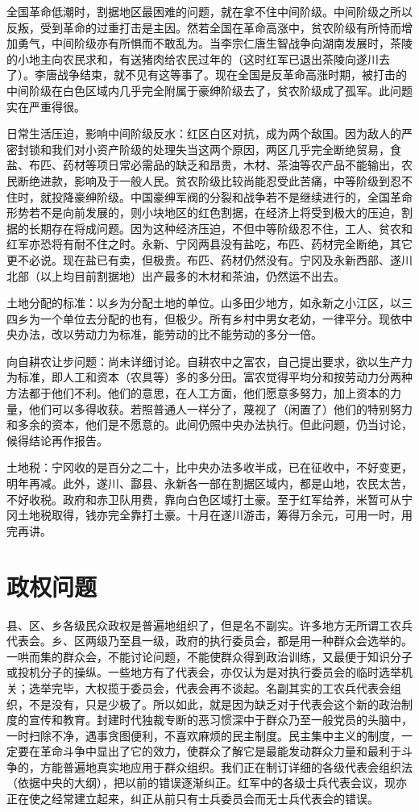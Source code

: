 全国革命低潮时，割据地区最困难的问题，就在拿不住中间阶级。中间阶级之所以反叛，受到革命的过重打击是主因。然若全国在革命高涨中，贫农阶级有所恃而增加勇气，中间阶级亦有所惧而不敢乱为。当李宗仁唐生智战争向湖南发展时，茶陵的小地主向农民求和，有送猪肉给农民过年的（这时红军已退出茶陵向遂川去了）。李唐战争结束，就不见有这等事了。现在全国是反革命高涨时期，被打击的中间阶级在白色区域内几乎完全附属于豪绅阶级去了，贫农阶级成了孤军。此问题实在严重得很。

日常生活压迫，影响中间阶级反水：红区白区对抗，成为两个敌国。因为敌人的严密封锁和我们对小资产阶级的处理失当这两个原因，两区几乎完全断绝贸易，食盐、布匹、药材等项日常必需品的缺乏和昂贵，木材、茶油等农产品不能输出，农民断绝进款，影响及于一般人民。贫农阶级比较尚能忍受此苦痛，中等阶级到忍不住时，就投降豪绅阶级。中国豪绅军阀的分裂和战争若不是继续进行的，全国革命形势若不是向前发展的，则小块地区的红色割据，在经济上将受到极大的压迫，割据的长期存在将成问题。因为这种经济压迫，不但中等阶级忍不住，工人、贫农和红军亦恐将有耐不住之时。永新、宁冈两县没有盐吃，布匹、药材完全断绝，其它更不必说。现在盐已有卖，但极贵。布匹、药材仍然没有。宁冈及永新西部、遂川北部（以上均目前割据地）出产最多的木材和茶油，仍然运不出去。

土地分配的标准：以乡为分配土地的单位。山多田少地方，如永新之小江区，以三四乡为一个单位去分配的也有，但极少。所有乡村中男女老幼，一律平分。现依中央办法，改以劳动力为标准，能劳动的比不能劳动的多分一倍。

向自耕农让步问题：尚未详细讨论。自耕农中之富农，自己提出要求，欲以生产力为标准，即人工和资本（农具等）多的多分田。富农觉得平均分和按劳动力分两种方法都于他们不利。他们的意思，在人工方面，他们愿意多努力，加上资本的力量，他们可以多得收获。若照普通人一样分了，蔑视了（闲置了）他们的特别努力和多余的资本，他们是不愿意的。此间仍照中央办法执行。但此问题，仍当讨论，候得结论再作报告。

土地税：宁冈收的是百分之二十，比中央办法多收半成，已在征收中，不好变更，明年再减。此外，遂川、酃县、永新各一部在割据区域内，都是山地，农民太苦，不好收税。政府和赤卫队用费，靠向白色区域打土豪。至于红军给养，米暂可从宁冈土地税取得，钱亦完全靠打土豪。十月在遂川游击，筹得万余元，可用一时，用完再讲。

\section{政权问题}

县、区、乡各级民众政权是普遍地组织了，但是名不副实。许多地方无所谓工农兵代表会。乡、区两级乃至县一级，政府的执行委员会，都是用一种群众会选举的。一哄而集的群众会，不能讨论问题，不能使群众得到政治训练，又最便于知识分子或投机分子的操纵。一些地方有了代表会，亦仅认为是对执行委员会的临时选举机关；选举完毕，大权揽于委员会，代表会再不谈起。名副其实的工农兵代表会组织，不是没有，只是少极了。所以如此，就是因为缺乏对于代表会这个新的政治制度的宣传和教育。封建时代独裁专断的恶习惯深中于群众乃至一般党员的头脑中，一时扫除不净，遇事贪图便利，不喜欢麻烦的民主制度。民主集中主义的制度，一定要在革命斗争中显出了它的效力，使群众了解它是最能发动群众力量和最利于斗争的，方能普遍地真实地应用于群众组织。我们正在制订详细的各级代表会组织法（依据中央的大纲），把以前的错误逐渐纠正。红军中的各级士兵代表会议，现亦正在使之经常建立起来，纠正从前只有士兵委员会而无士兵代表会的错误。

